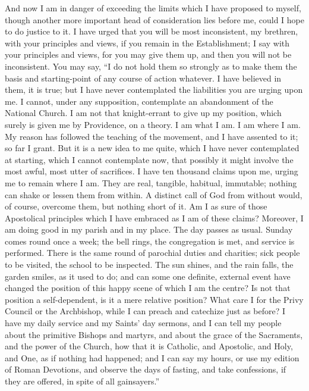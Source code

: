 And now I am in danger of exceeding the limits which I have
proposed to myself, though another more important head of
consideration lies before me, could I hope to do justice to it. I have
urged that you will be most inconsistent, my brethren, with your
principles and views, if you remain in the Establishment; I say with
your principles and views, for you may give them up, and then you will
not be inconsistent. You may say, ``I do not hold them so strongly
as to make them the basis and starting-point of any course of action
whatever. I have believed in them, it is true; but I have never
contemplated the liabilities you are urging upon me. I cannot, under
any supposition, contemplate an abandonment of the National Church. I
am not that knight-errant to give up my position, which surely is
given me by Providence, on a theory. I am what I am. I am where I am.
My reason has followed the teaching of the movement, and I have
assented to it; so far I grant. But it is a new idea to me quite,
which I have never contemplated at starting, which I cannot
contemplate now, that possibly it might involve the most awful, most
utter of sacrifices. I have ten thousand claims upon me, urging me to remain where I am. They are real, tangible, habitual, immutable;
nothing can shake or lessen them from within. A distinct call of God
from without would, of course, overcome them, but nothing short of it. Am
I as sure of those Apostolical principles which I have embraced as I
am of these claims? Moreover, I am doing good in my parish and in my
place. The day passes as usual. Sunday comes round once a week; the
bell rings, the congregation is met, and service is performed. There
is the same round of parochial duties and charities; sick people to be
visited, the school to be inspected. The sun shines, and the rain
falls, the garden smiles, as it used to do; and can some one definite,
external event have changed the position of this happy scene of which
I am the centre? Is not that position a self-dependent, is it a mere
relative position? What care I for the Privy Council or the
Archbishop, while I can preach and catechize just as before? I have my
daily service and my Saints' day sermons, and I can tell my people
about the primitive Bishops and martyrs, and about the grace of the
Sacraments, and the power of the Church, how that it is Catholic, and
Apostolic, and Holy, and One, as if nothing had happened; and I can
say my hours, or use my edition of Roman Devotions, and observe the
days of fasting, and take confessions, if they are offered, in spite
of all gainsayers.''

